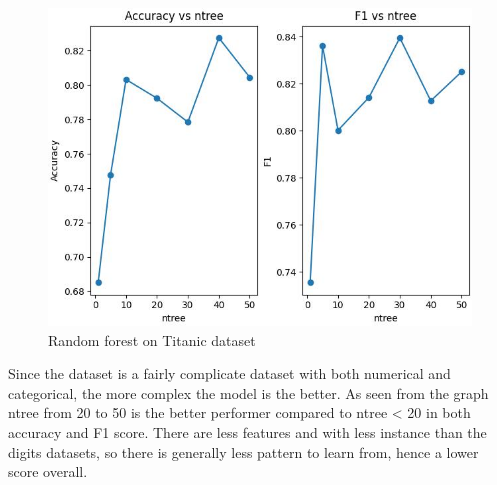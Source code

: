 \documentclass[letterpaper]{article}
\begin{document}
\begin{figure}[H]
	\includegraphics[width=\textwidth]{figures/forest_titanic.csv_ig.jpg}
	\caption{Random forest on Titanic dataset}
	\label{fig:forest-titanic}
\end{figure}

Since the dataset is a fairly complicate dataset with both numerical and categorical, the more complex the model is the better. As seen from the graph
ntree from 20 to 50 is the better performer compared to ntree < 20 in both accuracy and F1 score. There are less features and with less instance than
the digits datasets, so there is generally less pattern to learn from, hence a lower score overall.
\end{document}

